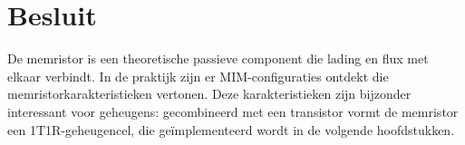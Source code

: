 \section{Besluit}
De memristor is een theoretische passieve component die lading en flux met elkaar verbindt. In de praktijk zijn er MIM-configuraties ontdekt die memristorkarakteristieken vertonen. Deze karakteristieken zijn bijzonder interessant voor geheugens: gecombineerd met een transistor vormt de memristor een 1T1R-geheugencel, die geïmplementeerd wordt in de volgende hoofdstukken.
